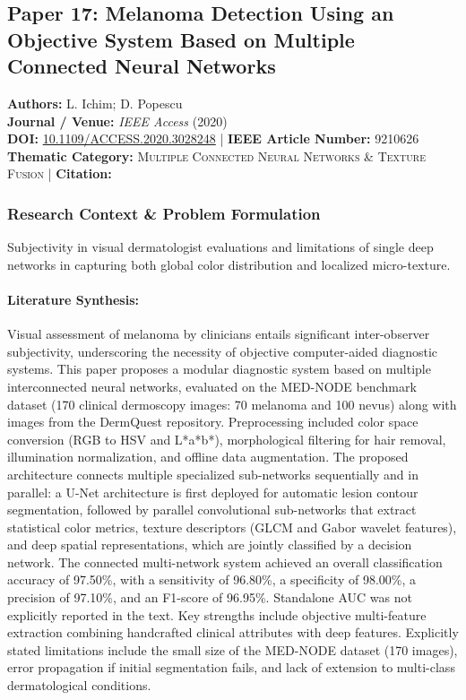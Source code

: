\subsection{Paper 17: Melanoma Detection Using an Objective System Based on Multiple Connected Neural Networks}
\label{sec:paper_17}

\begin{tcolorbox}[colback=gray!5!white,colframe=gray!75!black,title=\textbf{Metadata \& Citation Summary}]
\textbf{Authors:} L. Ichim; D. Popescu \\
\textbf{Journal / Venue:} \textit{IEEE Access} (2020) \\
\textbf{DOI:} \href{https://doi.org/10.1109/ACCESS.2020.3028248}{10.1109/ACCESS.2020.3028248} \quad | \quad \textbf{IEEE Article Number:} 9210626 \\
\textbf{Thematic Category:} \textsc{Multiple Connected Neural Networks \& Texture Fusion} \quad | \quad \textbf{Citation:} \cite{9210626}
\end{tcolorbox}

\subsubsection*{Research Context \& Problem Formulation}
Subjectivity in visual dermatologist evaluations and limitations of single deep networks in capturing both global color distribution and localized micro-texture.

\paragraph{Literature Synthesis:} Visual assessment of melanoma by clinicians entails significant inter-observer subjectivity, underscoring the necessity of objective computer-aided diagnostic systems. This paper proposes a modular diagnostic system based on multiple interconnected neural networks, evaluated on the MED-NODE benchmark dataset (170 clinical dermoscopy images: 70 melanoma and 100 nevus) along with images from the DermQuest repository. Preprocessing included color space conversion (RGB to HSV and L*a*b*), morphological filtering for hair removal, illumination normalization, and offline data augmentation. The proposed architecture connects multiple specialized sub-networks sequentially and in parallel: a U-Net architecture is first deployed for automatic lesion contour segmentation, followed by parallel convolutional sub-networks that extract statistical color metrics, texture descriptors (GLCM and Gabor wavelet features), and deep spatial representations, which are jointly classified by a decision network. The connected multi-network system achieved an overall classification accuracy of 97.50\%, with a sensitivity of 96.80\%, a specificity of 98.00\%, a precision of 97.10\%, and an F1-score of 96.95\%. Standalone AUC was not explicitly reported in the text. Key strengths include objective multi-feature extraction combining handcrafted clinical attributes with deep features. Explicitly stated limitations include the small size of the MED-NODE dataset (170 images), error propagation if initial segmentation fails, and lack of extension to multi-class dermatological conditions.

